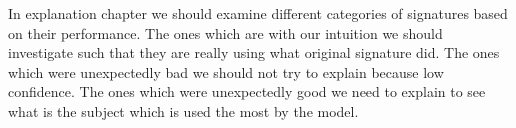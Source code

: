In explanation chapter we should examine different categories of signatures based on their performance. The ones which are with our intuition we should investigate such that they are really using what original signature did. The ones which were unexpectedly bad we should not try to explain because low confidence. The ones which were unexpectedly good we need to explain to see what is the subject which is used the most by the model.















